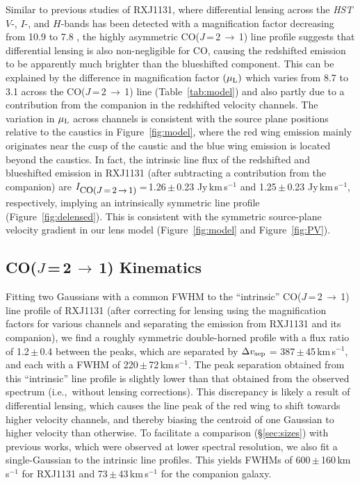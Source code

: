 \documentclass[]{emulateapj}
\newcommand{\rarr}{$\rightarrow$}
\newcommand{\bco}{\mbox{CO($J$\,=\,2\,\rarr\,1)}\xspace}
\newcommand{\kms}{\mbox{km\,s$^{-1}$}\xspace}
\newcommand{\pmm}{\,$\pm$\,}
\newcommand{\ie}{{i.e.,~}}
\newcommand{\Fig}[1]{Figure~\ref{fig:#1}}
\newcommand{\Tab}[1]{Table~\ref{tab:#1}}
\newcommand{\Sec}[1]{\S\ref{sec:#1}}
\begin{document}
Similar to previous studies of RXJ1131, where
differential lensing across the {\it HST}
$V$-, $I$-, and $H$-bands has been detected with a
magnification factor decreasing from 10.9 to 7.8 ,
the highly asymmetric \bco line profile suggests that
differential lensing is also non-negligible for CO,
causing the redshifted emission to be apparently much brighter than the
blueshifted component.
This can be explained by the difference in magnification factor $(\mu_{\rm L})$ which
varies from 8.7 to 3.1 across the \bco line (\Tab{model}) and also partly due to a contribution from the companion in the redshifted velocity channels.
The variation in $\mu_{\rm L}$ across channels is consistent with the source plane
positions relative to the caustics in \Fig{model}, where the red wing
emission mainly originates near the cusp
of the caustic and the blue wing emission is located beyond the caustics.
In fact, the intrinsic line flux of the redshifted and
blueshifted emission in RXJ1131 (after subtracting a contribution from the companion)
are $I_{\small \bco}$\,=\,1.26\pmm 0.23 Jy\,\kms and 1.25\pmm0.23 Jy\,\kms, respectively,
implying an intrinsically symmetric line profile (\Fig{delensed}). This is consistent with the symmetric source-plane
velocity gradient in our lens model (\Fig{model} and \Fig{PV}).

\subsection{\bco Kinematics}
Fitting two Gaussians with a common FWHM
to the ``intrinsic'' \bco line profile of RXJ1131 (after correcting for lensing using
the magnification factors for various channels and separating the emission from RXJ1131 and its companion),
we find a roughly symmetric double-horned profile with a flux ratio of 1.2\pmm0.4 between the peaks, which
are separated by
$\Delta v_{\rm sep}$ = 387\pmm45\,\kms, and each with a
FWHM of 220\pmm72\,\kms.
The peak separation obtained from this ``intrinsic'' line profile is
slightly lower than that obtained from the observed spectrum (\ie without lensing corrections).
This discrepancy is likely a result of differential lensing, which causes the line peak of the red wing
to shift towards higher velocity channels, and thereby biasing the centroid of
one Gaussian to higher velocity than otherwise.
To facilitate a comparison (\Sec{sizes}) with previous works, which were observed at lower spectral resolution,
we also fit a single-Gaussian to the intrinsic line profiles.
This yields FWHMs of 600\pmm160\,\kms for RXJ1131
and 73\pmm43\,\kms for the companion galaxy.
\end{document}
